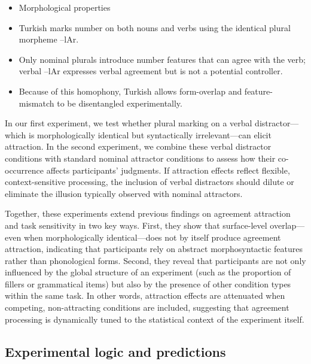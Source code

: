 \documentclass[
  authoryear,
  preprint]{elsarticle}
\providecommand{\tightlist}{%
  \setlength{\itemsep}{0pt}\setlength{\parskip}{0pt}}
\begin{document}
\begin{itemize}
\tightlist
\item
  Morphological properties
\item
  Turkish marks number on both nouns and verbs using the identical
  plural morpheme --lAr.
\item
  Only nominal plurals introduce number features that can agree with the
  verb; verbal --lAr expresses verbal agreement but is not a potential
  controller.
\item
  Because of this homophony, Turkish allows form-overlap and
  feature-mismatch to be disentangled experimentally.
\end{itemize}

In our first experiment, we test whether plural marking on a verbal
distractor---which is morphologically identical but syntactically
irrelevant---can elicit attraction. In the second experiment, we combine
these verbal distractor conditions with standard nominal attractor
conditions to assess how their co-occurrence affects participants'
judgments. If attraction effects reflect flexible, context-sensitive
processing, the inclusion of verbal distractors should dilute or
eliminate the illusion typically observed with nominal attractors.

Together, these experiments extend previous findings on agreement
attraction and task sensitivity in two key ways. First, they show that
surface-level overlap---even when morphologically identical---does not
by itself produce agreement attraction, indicating that participants
rely on abstract morphosyntactic features rather than phonological
forms. Second, they reveal that participants are not only influenced by
the global structure of an experiment (such as the proportion of fillers
or grammatical items) but also by the presence of other condition types
within the same task. In other words, attraction effects are attenuated
when competing, non-attracting conditions are included, suggesting that
agreement processing is dynamically tuned to the statistical context of
the experiment itself.

\subsection{Experimental logic and
predictions}\label{experimental-logic-and-predictions}
\end{document}
